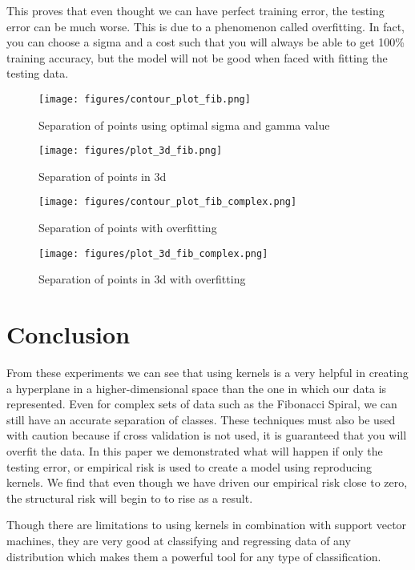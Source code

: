 \documentclass[11pt, twoside]{article}   	%
\begin{document}
\color{lightgray}
\color{black}

This proves that even thought we can have perfect training error, the testing
error can be much worse. This is due to a phenomenon called overfitting. In fact, 
you can choose a sigma and a cost such that you will always be able to get 
100\% training accuracy, but the model will not be good when faced with fitting
the testing data. 

\begin{figure}[h]
\centering
\texttt{[image: figures/contour\_plot\_fib.png]}
\caption{Separation of points using optimal sigma and gamma value}
\label{fig:sigma_gamma_fib} 
\end{figure}


\begin{figure}[h]
\centering
\texttt{[image: figures/plot\_3d\_fib.png]}
\caption{Separation of points in 3d}
\label{fig:plot_3d_fib} 
\end{figure}

\begin{figure}[h]
\centering
\texttt{[image: figures/contour\_plot\_fib\_complex.png]}
\caption{Separation of points with overfitting}
\label{fig:sigma_gamma_fib_overfit} 
\end{figure}


\begin{figure}[h]
\centering
\texttt{[image: figures/plot\_3d\_fib\_complex.png]}
\caption{Separation of points in 3d with overfitting}
\label{fig:plot_3d_fib_overfit} 
\end{figure}

\section{Conclusion}
From these experiments we can see that using kernels is a very helpful in creating a hyperplane
in a higher-dimensional space than the one in which our data is represented. 
Even for complex sets of data such as the Fibonacci Spiral, 
we can still have an accurate separation of classes. These techniques must also be used
with caution because if cross validation is not used, it is guaranteed that you will overfit the data. In this paper we
 demonstrated what will 
happen if only the testing error, or empirical risk is used to create a model using reproducing 
kernels. We find that even though we have driven our empirical risk close to zero, the structural 
risk will begin to to rise as a result. 

Though there are limitations to using kernels in combination with support vector machines, they are very 
good at classifying and regressing data of any distribution which makes them a powerful tool 
for any type of classification.



\end{document}
